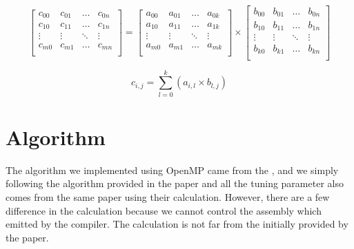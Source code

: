 \[
\begin{bmatrix}
    c_{00}  & c_{01}    & \dots     & c_{0n}\\
    c_{10}  & c_{11}    & \dots     & c_{1n}\\
    \vdots  & \vdots    & \ddots    & \vdots\\
    c_{m0}  & c_{m1}    & \dots     & c_{mn}\\
\end{bmatrix}
= 
\begin{bmatrix}
    a_{00}  & a_{01}    & \dots     & a_{0k}\\
    a_{10}  & a_{11}    & \dots     & a_{1k}\\
    \vdots  & \vdots    & \ddots    & \vdots\\
    a_{m0}  & a_{m1}    & \dots     & a_{mk}\\
\end{bmatrix}
\times
\begin{bmatrix}
    b_{00}  & b_{01}    & \dots     & b_{0n}\\
    b_{10}  & b_{11}    & \dots     & b_{1n}\\
    \vdots  & \vdots    & \ddots    & \vdots\\
    b_{k0}  & b_{k1}    & \dots     & b_{kn}\\
\end{bmatrix}
\]

\vspace*{0.5cm}

\begin{equation}
    c_{i,j} = \sum_{l=0}^k (a_{i,l} \times b_{l,j})
\end{equation}

\clearpage

\section{Algorithm}

The algorithm we implemented using OpenMP came from the \cite{BLIS}, 
and we simply following the algorithm provided in the paper 
and all the tuning parameter also comes from the same paper using 
their calculation. However, there are a few difference in the 
calculation because we cannot control the assembly which emitted 
by the compiler. The calculation is not far from the initially 
provided by the paper.

